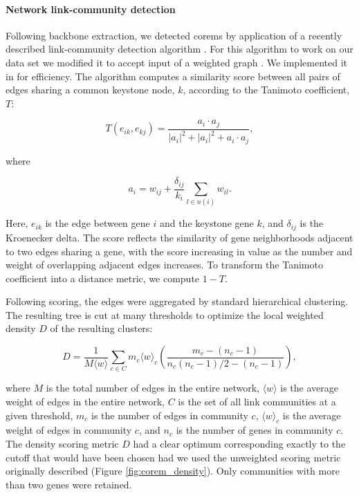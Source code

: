 \paragraph{Network link-community detection}
\label{section:linkcommunity}
Following backbone extraction, we detected corems by application of a
recently described link-community detection
algorithm \cite{Ahn2010}. For this algorithm to work on our data set
we modified it to accept input of a weighted graph \cite{Kalinka2011}.
We implemented it in  for efficiency. The algorithm
computes a similarity score between all pairs of edges sharing a
common keystone node, $k$, according to the Tanimoto coefficient, $T$:

\begin{equation}
T(e_{ik},e_{kj}) = \frac{a_i\cdot a_j}{|a_i|^2+|a_i|^2+a_i\cdot a_j},
\end{equation}

\noindent where

\begin{equation}
a_i=w_{ij}+\frac{\delta_{ij}}{k_i}\sum_{l\in n(i)}w_{il}.
\end{equation}

\noindent Here, $e_{ik}$ is the edge between gene $i$
and the keystone gene $k$, and $\delta_{ij}$ is the Kroenecker delta. The score
reflects the similarity of gene neighborhoods adjacent to two edges
sharing a gene, with the score increasing in value as the number and
weight of overlapping adjacent edges increases. To transform the
Tanimoto coefficient into a distance metric, we compute $1-T$.

Following scoring, the edges were aggregated by standard hierarchical
clustering. The resulting tree is cut at many thresholds to optimize
the local weighted density $D$ of the resulting clusters:

\begin{equation}
D=\frac{1}{M\langle w\rangle}\sum_{c\in C}m_c\langle w\rangle_c\left(\frac{m_c-(n_c-1)}{n_c(n_c-1)/2-(n_c-1)}\right),
\end{equation}

\noindent where $M$ is the total number of edges in the
entire network, $\langle w\rangle$ is the average weight of edges in the entire
network, $C$ is the set of all link communities at a given threshold, $m_c$
is the number of edges in community $c$, $\langle w\rangle_c$ is the average weight of
edges in community $c$, and $n_c$ is the number of genes in community
$c$. The density scoring metric $D$ had a clear optimum corresponding exactly to
the cutoff that would have been chosen had we used the unweighted
scoring metric originally described (Figure \ref{fig:corem_density}). Only
communities with more than two genes were retained.

